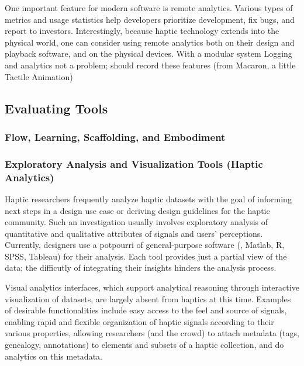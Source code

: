 One important feature for modern software is remote analytics.
Various types of metrics and usage statistics help developers prioritize development, fix bugs, and report to investors.
Interestingly, because haptic technology extends into the physical world, one can consider using remote analytics both on their design and playback software, and on the physical devices.
With a modular system
Logging and analytics not a problem; should record these features (from Macaron, a little Tactile Animation)




%
%
\subsection{Evaluating \haxd Tools}


\subsubsection{Flow, Learning, Scaffolding, and Embodiment}




\subsubsection{Exploratory Analysis and Visualization Tools (Haptic Analytics)} 
Haptic researchers frequently analyze haptic datasets with the goal of informing next steps in a design use case or deriving design guidelines for the haptic community. 
Such an  investigation usually involves exploratory analysis of quantitative and qualitative attributes of signals and users' perceptions. 
Currently, designers use a potpourri of general-purpose software (\eg, Matlab, R, SPSS, Tableau) for their analysis. Each tool provides just a partial view of the data; the difficutly of integrating their insights hinders the analysis process. 

Visual analytics interfaces, which support analytical reasoning through interactive visualization of datasets, are largely absent from haptics at this time. 
Examples of desirable functionalities  include easy access to the feel and source of signals, enabling rapid and flexible organization of haptic signals according to their various properties, allowing researchers (and the crowd) to attach metadata (tags, genealogy, annotations) to elements and subsets of a haptic collection, and do analytics on this metadata.


